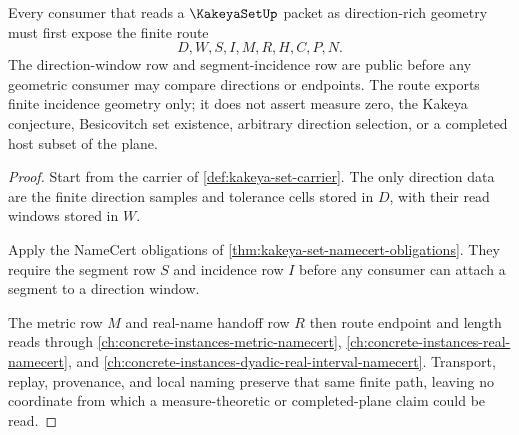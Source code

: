 \begin{theorem}
\label{thm:kakeya-set-direction-window-route}
Every consumer that reads a $\KakeyaSetUp$ packet as direction-rich geometry must first expose the finite route
$$
D,W,S,I,M,R,H,C,P,N .
$$
The direction-window row and segment-incidence row are public before any geometric consumer may compare directions or endpoints. The route exports finite incidence geometry only; it does not assert measure zero, the Kakeya conjecture, Besicovitch set existence, arbitrary direction selection, or a completed host subset of the plane.
\end{theorem}
\begin{proof}
Start from the carrier of \autoref{def:kakeya-set-carrier}. The only direction data are the finite direction samples and tolerance cells stored in $D$, with their read windows stored in $W$.

Apply the NameCert obligations of \autoref{thm:kakeya-set-namecert-obligations}. They require the segment row $S$ and incidence row $I$ before any consumer can attach a segment to a direction window.

The metric row $M$ and real-name handoff row $R$ then route endpoint and length reads through \autoref{ch:concrete-instances-metric-namecert}, \autoref{ch:concrete-instances-real-namecert}, and \autoref{ch:concrete-instances-dyadic-real-interval-namecert}. Transport, replay, provenance, and local naming preserve that same finite path, leaving no coordinate from which a measure-theoretic or completed-plane claim could be read.
\end{proof}


\begin{closurestatus}{\KakeyaSetUp}
  \theoryclosure{\seedClosure}
  \formalstatus{\unformalizedV}
\end{closurestatus}
